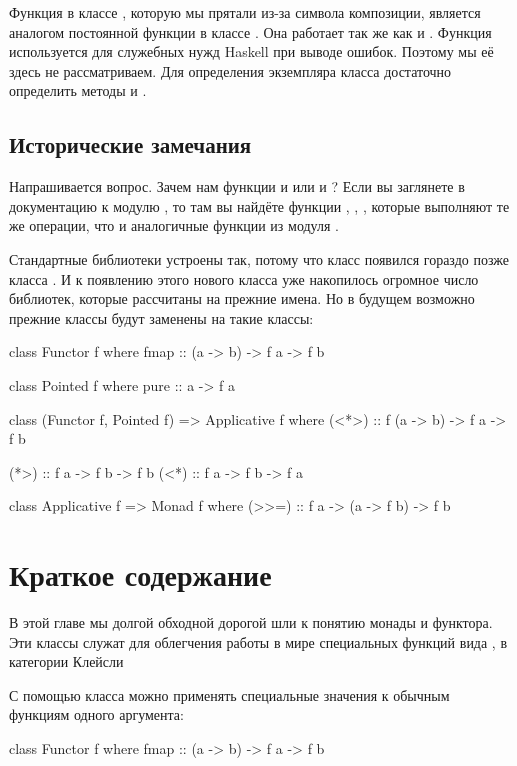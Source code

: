 Функция \In{>>} в классе , которую
мы прятали из-за символа композиции, является 
аналогом постоянной функции в классе .
Она работает так же как и \In{*>}. 
Функция  используется для служебных нужд Haskell при выводе
ошибок. Поэтому мы её здесь не рассматриваем. Для определения 
экземпляра класса  достаточно определить методы
 и \In{>>=}.

\subsection{Исторические замечания}

Напрашивается вопрос.
Зачем нам функции  и  или \In{*>} и \In{>>}?
Если вы заглянете в документацию к модулю ,
то там вы найдёте функции , , ,
которые выполняют те же операции, что и аналогичные функции
из модуля .

Стандартные библиотеки устроены так, потому что класс 
 появился гораздо позже класса . 
И к появлению этого нового класса уже накопилось огромное 
число библиотек, которые рассчитаны на прежние имена. 
Но в будущем возможно прежние классы будут заменены на такие классы:

\begin{code}
class Functor f where
    fmap :: (a -> b) -> f a -> f b

class Pointed f where
    pure :: a -> f a

class (Functor f, Pointed f) => Applicative f where
    (<*>) :: f (a -> b) -> f a -> f b

    (*>)  :: f a -> f b -> f b
    (<*)  :: f a -> f b -> f a

class Applicative f => Monad f where
    (>>=) :: f a -> (a -> f b) -> f b
\end{code}


\section{Краткое содержание}

В этой главе мы долгой обходной дорогой шли к понятию монады
и функтора. Эти классы служат для облегчения работы в мире
специальных функций вида , в категории Клейсли

С помощью класса  можно применять специальные
значения к обычным функциям одного аргумента:

\begin{code}
class Functor f where
    fmap :: (a -> b) -> f a -> f b
\end{code}

